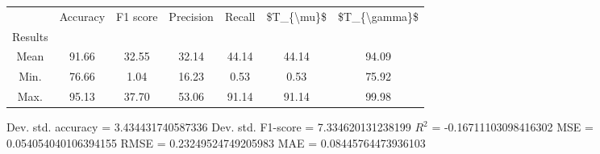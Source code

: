 \begin{tabular}{|c|c|c|c|c|c|c|}
\toprule
{} &  Accuracy &  F1 score &  Precision &  Recall &  \$T\_\{\textbackslash mu\}\$ &  \$T\_\{\textbackslash gamma\}\$ \\
Results &           &           &            &         &            &               \\
\hline
Mean    &     91.66 &     32.55 &      32.14 &   44.14 &      44.14 &         94.09 \\
Min.    &     76.66 &      1.04 &      16.23 &    0.53 &       0.53 &         75.92 \\
Max.    &     95.13 &     37.70 &      53.06 &   91.14 &      91.14 &         99.98 \\
\bottomrule
\end{tabular}

 Dev. std. accuracy = 3.434431740587336
 Dev. std. F1-score = 7.334620131238199
 $R^2$ = -0.16711103098416302
 MSE = 0.054054040106394155
 RMSE = 0.23249524749205983
 MAE = 0.08445764473936103